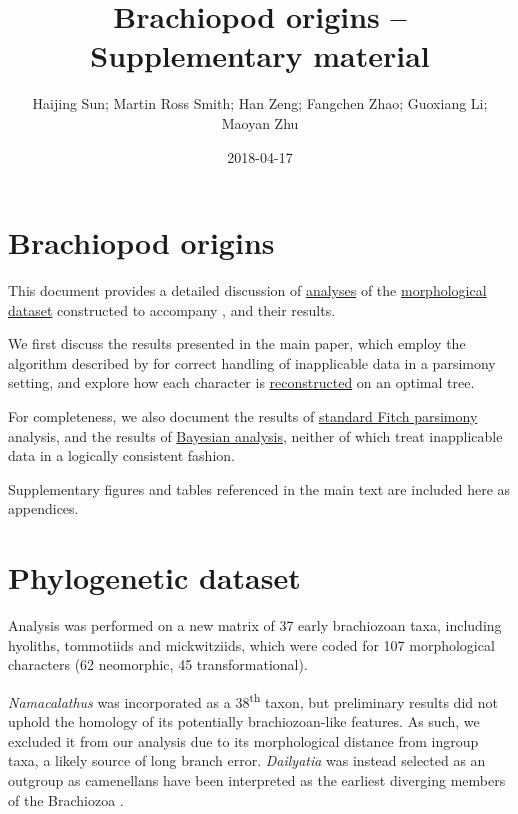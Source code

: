 \documentclass[openany]{book}
\title{Brachiopod origins -- Supplementary material}
\author{Haijing Sun; Martin Ross Smith; Han Zeng; Fangchen Zhao; Guoxiang Li;
Maoyan Zhu}
\date{2018-04-17}
\theoremstyle{definition}
\theoremstyle{definition}
\theoremstyle{definition}
\theoremstyle{remark}
\begin{document}
\maketitle

{
\setcounter{tocdepth}{1}
\tableofcontents
}
\hypertarget{brachiopod-origins}{%
\chapter*{Brachiopod origins}\label{brachiopod-origins}}

This document provides a detailed discussion of
\protect\hyperlink{treesearch}{analyses} of the
\protect\hyperlink{dataset}{morphological dataset} constructed to
accompany \citet{Sun2018Hyolithswith}, and their results.

We first discuss the results presented in the main paper, which employ
the algorithm described by \citet{Brazeau2018} for correct handling of
inapplicable data in a parsimony setting, and explore how each character
is \protect\hyperlink{reconstructions}{reconstructed} on an optimal
tree.

For completeness, we also document the results of
\protect\hyperlink{fitch}{standard Fitch parsimony} analysis, and the
results of \protect\hyperlink{bayesian}{Bayesian analysis}, neither of
which treat inapplicable data in a logically consistent fashion.

Supplementary figures and tables referenced in the main text are
included here as appendices.

\hypertarget{dataset}{%
\chapter{Phylogenetic dataset}\label{dataset}}

Analysis was performed on a new matrix of 37 early brachiozoan taxa,
including hyoliths, tommotiids and mickwitziids, which were coded for
107 morphological characters (62 neomorphic, 45 transformational).

\emph{Namacalathus} was incorporated as a 38\textsuperscript{th} taxon,
but preliminary results did not uphold the homology of its potentially
brachiozoan-like features. As such, we excluded it from our analysis due
to its morphological distance from ingroup taxa, a likely source of long
branch error. \emph{Dailyatia} was instead selected as an outgroup as
camenellans have been interpreted as the earliest diverging members of
the Brachiozoa \citep{Skovsted2015Theearly, Zhao2017}.
\end{document}
